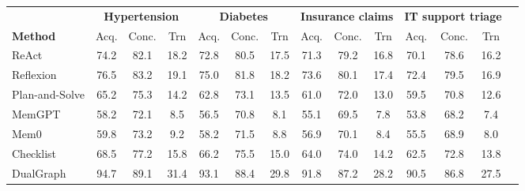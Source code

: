 \begin{tabular}{@{}lccccccccccccc@{}}
\toprule
& \multicolumn{3}{c}{\textbf{Hypertension}} & \multicolumn{3}{c}{\textbf{Diabetes}} & \multicolumn{3}{c}{\textbf{Insurance claims}} & \multicolumn{3}{c}{\textbf{IT support triage}} \\
\cmidrule(lr){2-4}\cmidrule(lr){5-7}\cmidrule(lr){8-10}\cmidrule(lr){11-13}
\textbf{Method} & Acq. & Conc. & Trn & Acq. & Conc. & Trn & Acq. & Conc. & Trn & Acq. & Conc. & Trn \\
\midrule
ReAct & 74.2 & 82.1 & 18.2 & 72.8 & 80.5 & 17.5 & 71.3 & 79.2 & 16.8 & 70.1 & 78.6 & 16.2 \\
Reflexion & 76.5 & 83.2 & 19.1 & 75.0 & 81.8 & 18.2 & 73.6 & 80.1 & 17.4 & 72.4 & 79.5 & 16.9 \\
Plan-and-Solve & 65.2 & 75.3 & 14.2 & 62.8 & 73.1 & 13.5 & 61.0 & 72.0 & 13.0 & 59.5 & 70.8 & 12.6 \\
MemGPT & 58.2 & 72.1 & 8.5 & 56.5 & 70.8 & 8.1 & 55.1 & 69.5 & 7.8 & 53.8 & 68.2 & 7.4 \\
Mem0 & 59.8 & 73.2 & 9.2 & 58.2 & 71.5 & 8.8 & 56.9 & 70.1 & 8.4 & 55.5 & 68.9 & 8.0 \\
Checklist & 68.5 & 77.2 & 15.8 & 66.2 & 75.5 & 15.0 & 64.0 & 74.0 & 14.2 & 62.5 & 72.8 & 13.8 \\
DualGraph & 94.7 & 89.1 & 31.4 & 93.1 & 88.4 & 29.8 & 91.8 & 87.2 & 28.2 & 90.5 & 86.8 & 27.5 \\
\bottomrule
\end{tabular}